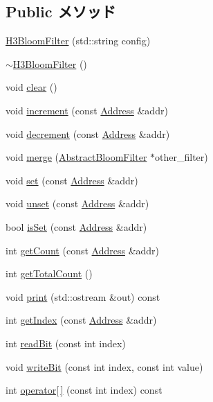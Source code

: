 \subsection*{Public メソッド}
\begin{DoxyCompactItemize}
\item 
\hyperlink{classH3BloomFilter_a473a691277c02ebbcd37483cc5bdc324}{H3BloomFilter} (std::string config)
\item 
\hyperlink{classH3BloomFilter_a4267fd045f1a2b59d8f82a39c703de7c}{$\sim$H3BloomFilter} ()
\item 
void \hyperlink{classH3BloomFilter_ac8bb3912a3ce86b15842e79d0b421204}{clear} ()
\item 
void \hyperlink{classH3BloomFilter_a3e860ad851b771ac3b6eeb1716eb56bc}{increment} (const \hyperlink{classAddress}{Address} \&addr)
\item 
void \hyperlink{classH3BloomFilter_addb6b805abb8328082a24926f2bf8c84}{decrement} (const \hyperlink{classAddress}{Address} \&addr)
\item 
void \hyperlink{classH3BloomFilter_a4091f5f95de040d4e0ae5bd86817b13c}{merge} (\hyperlink{classAbstractBloomFilter}{AbstractBloomFilter} $\ast$other\_\-filter)
\item 
void \hyperlink{classH3BloomFilter_a2b666fae2a5c2b98bc5cba8e1333bcc9}{set} (const \hyperlink{classAddress}{Address} \&addr)
\item 
void \hyperlink{classH3BloomFilter_a69b772787ea61467af679e3aa5406b41}{unset} (const \hyperlink{classAddress}{Address} \&addr)
\item 
bool \hyperlink{classH3BloomFilter_a4200ee289c3d941a4b209c4788f8087c}{isSet} (const \hyperlink{classAddress}{Address} \&addr)
\item 
int \hyperlink{classH3BloomFilter_abb722634d5846105b673e9496df8d062}{getCount} (const \hyperlink{classAddress}{Address} \&addr)
\item 
int \hyperlink{classH3BloomFilter_a97f66183ea41a7c123bab9dd5313a74a}{getTotalCount} ()
\item 
void \hyperlink{classH3BloomFilter_ac55fe386a101fbae38c716067c9966a0}{print} (std::ostream \&out) const 
\item 
int \hyperlink{classH3BloomFilter_a19f42f6f2fc3501021b768f0df8108b2}{getIndex} (const \hyperlink{classAddress}{Address} \&addr)
\item 
int \hyperlink{classH3BloomFilter_a6f8a98d0f38a8d122d4cbf87323484eb}{readBit} (const int index)
\item 
void \hyperlink{classH3BloomFilter_ac188318778d26b44f567c5b530598c16}{writeBit} (const int index, const int value)
\item 
int \hyperlink{classH3BloomFilter_ad7ab71ad11e6bca06c3534af5707d8fc}{operator\mbox{[}$\,$\mbox{]}} (const int index) const 
\end{DoxyCompactItemize}
